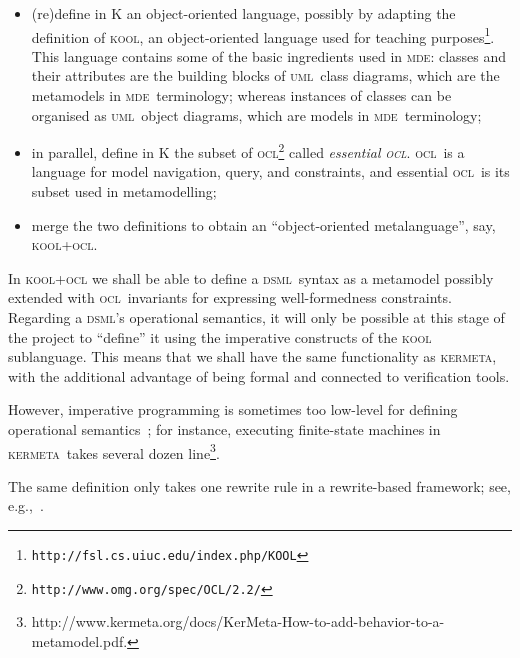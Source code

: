 \documentclass[a4paper,11pt,twoside]{article}
\newcommand{\dsml}{\textsc{dsml}}
\newcommand{\mde}{\textsc{mde}}
\newcommand{\kmt}{\textsc{kermeta}}
\newcommand{\uml}{\textsc{uml}}
\newcommand{\ocl}{\textsc{ocl}}
\begin{document}
\begin{itemize}
\item (re)define in K an object-oriented language, possibly by adapting the definition of  \textsc{kool}, an object-oriented language used for teaching purposes\footnote{\tt http://fsl.cs.uiuc.edu/index.php/KOOL}. This language contains some of the basic ingredients used in \mde: classes and their attributes are the building blocks of \uml\ class diagrams,
which are the metamodels in \mde\ terminology; whereas
instances of classes can be organised as \uml\ object diagrams, which are models in \mde\ terminology;
\item in parallel, define in K the subset of  \ocl\footnote{\tt http://www.omg.org/spec/OCL/2.2/} called \emph{essential \ocl}. \ocl\ is a language for model navigation, 
 query, and constraints, and essential \ocl\  is its  subset used in metamodelling;
\item merge  the two definitions to obtain an ``object-oriented metalanguage'', say, \textsc{kool+ocl}.
\end{itemize}

In \textsc{kool+ocl}  we shall be able to define a \dsml\ syntax as a metamodel possibly extended with \ocl\ invariants for expressing well-formedness constraints. Regarding a  \dsml's operational semantics, it will only  be possible
at this stage of the project to ``define'' it using the imperative constructs of the \textsc{kool} sublanguage. This means that we shall have the same functionality as \kmt, with the additional advantage of being formal and connected to verification tools.


 However,  imperative programming is sometimes too low-level for defining operational semantics~; for instance, executing
finite-state machines in \kmt\ takes several dozen line\footnote{http://www.kermeta.org/docs/KerMeta-How-to-add-behavior-to-a-metamodel.pdf.}.

The same definition only takes one  rewrite  rule in a rewrite-based framework; see, e.g.,~\cite{r10b}. 
\end{document}
